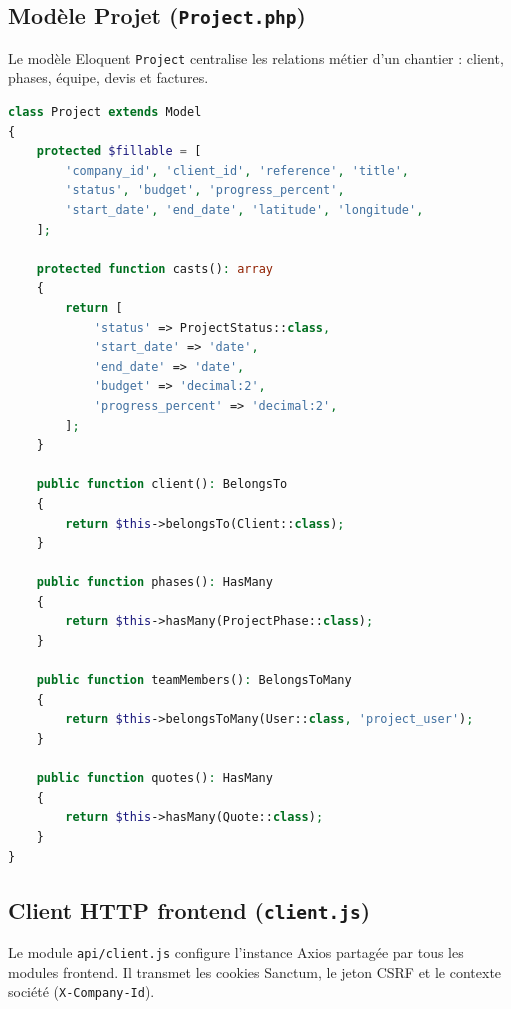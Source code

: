 \subsection{Modèle Projet (\texttt{Project.php})}

Le modèle Eloquent \texttt{Project} centralise les relations métier d'un chantier :
client, phases, équipe, devis et factures.

\begin{lstlisting}[language=PHP,
  caption={Project.php : relations Eloquent (extrait)}]
class Project extends Model
{
    protected $fillable = [
        'company_id', 'client_id', 'reference', 'title',
        'status', 'budget', 'progress_percent',
        'start_date', 'end_date', 'latitude', 'longitude',
    ];

    protected function casts(): array
    {
        return [
            'status' => ProjectStatus::class,
            'start_date' => 'date',
            'end_date' => 'date',
            'budget' => 'decimal:2',
            'progress_percent' => 'decimal:2',
        ];
    }

    public function client(): BelongsTo
    {
        return $this->belongsTo(Client::class);
    }

    public function phases(): HasMany
    {
        return $this->hasMany(ProjectPhase::class);
    }

    public function teamMembers(): BelongsToMany
    {
        return $this->belongsToMany(User::class, 'project_user');
    }

    public function quotes(): HasMany
    {
        return $this->hasMany(Quote::class);
    }
}
\end{lstlisting}

\subsection{Client HTTP frontend (\texttt{client.js})}

Le module \texttt{api/client.js} configure l'instance Axios partagée par tous
les modules frontend. Il transmet les cookies Sanctum, le jeton CSRF et le
contexte société (\texttt{X-Company-Id}).

